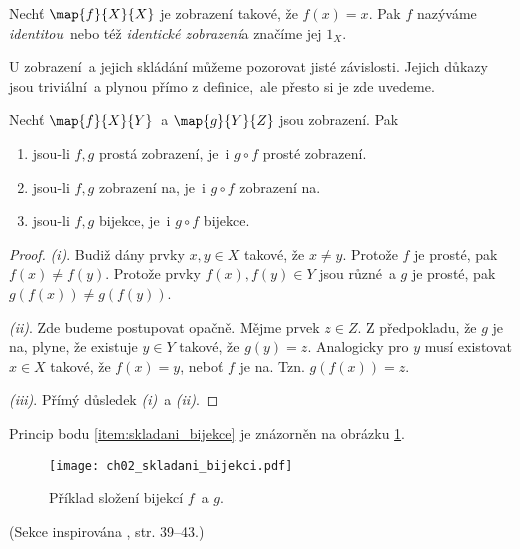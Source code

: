 \begin{definition}[Identita]\label{def:identita}
    Nechť $\map{f}{X}{X}$ je zobrazení takové, že $f(x)=x$. Pak $f$ nazýváme \emph{identitou}~nebo též \emph{identické zobrazení}a značíme jej $1_X$.
\end{definition}
U zobrazení~a jejich skládání můžeme pozorovat jisté závislosti. Jejich důkazy jsou triviální~a plynou přímo z definice,~ale přesto si je zde uvedeme.
\begin{proposition}\label{prop:vlastnosti_skladani_zobrazeni}
    Nechť $\map{f}{X}{Y}$~a $\map{g}{Y}{Z}$ jsou zobrazení. Pak
    \begin{enumerate}[label=(\roman*)]
        \item\label{item:skladani_injekce} jsou-li $f,g$ prostá zobrazení, je~i $g\circ f$ prosté zobrazení.
        \item\label{item:skladani_surjekce} jsou-li $f,g$ zobrazení na, je~i $g\circ f$ zobrazení na.
        \item\label{item:skladani_bijekce} jsou-li $f,g$ bijekce, je~i $g\circ f$ bijekce.
    \end{enumerate}
\end{proposition}
\begin{proof}
    \textit{(i)}. Budiž dány prvky $x,y\in X$ takové, že $x\neq y$. Protože $f$ je prosté, pak $f(x)\neq f(y)$. Protože prvky $f(x),f(y)\in Y$ jsou různé~a $g$ je prosté, pak $g(f(x))\neq g(f(y))$.\par
    \textit{(ii)}. Zde budeme postupovat opačně. Mějme prvek $z\in Z$. Z předpokladu, že $g$ je na, plyne, že existuje $y\in Y$ takové, že $g(y)=z$. Analogicky pro $y$ musí existovat $x\in X$ takové, že $f(x)=y$, neboť $f$ je na. Tzn. $g(f(x))=z$.\par
    \textit{(iii)}. Přímý důsledek \textit{(i)}~a \textit{(ii)}.
\end{proof}
Princip bodu \ref{item:skladani_bijekce} je znázorněn na obrázku \ref{fig:skladani_bijekci}.
\begin{figure}[H]
    \centering
    \texttt{[image: ch02\_skladani\_bijekci.pdf]}
    \caption{Příklad složení bijekcí $f$~a $g$.}
    \label{fig:skladani_bijekci}
\end{figure}
(Sekce inspirována \cite{MatousekNesetril2009}, str. 39--43.)